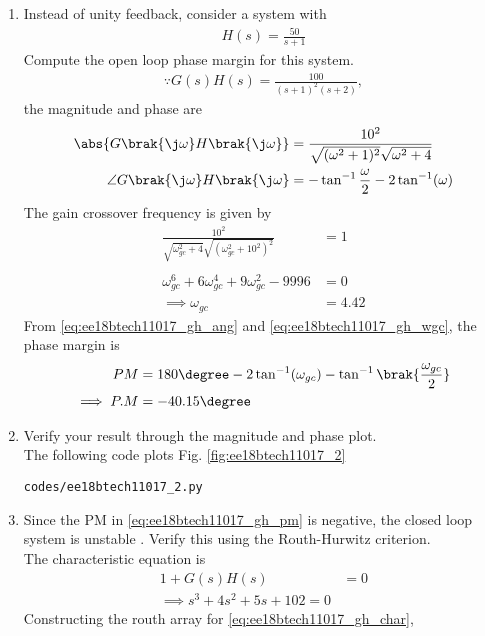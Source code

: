 \begin{enumerate}[label=\thesection.\arabic*.,ref=\thesection.\theenumi]
\item Instead of unity feedback, consider a system with 
%
\begin{align}
H(s)=\frac{50}{s+1}
\end{align}
%
Compute the open loop phase margin for this system.
\\
\solution 
%
\begin{align}
\because G(s)H(s)=\frac{100}{(s+1)^{2}(s+2)},
\label{eq:ee18btech11017_gh}
\end{align}
%
the  magnitude and phase are
\begin{align}
\label{eq:ee18btech11017_gh_mag}
\abs{G\brak{\j\omega}H\brak{\j\omega}}&=\frac{10^{2}}{ \sqrt{(\omega^{2}+1)^{2}}
\sqrt{\omega^{2}+4}} \\
\angle G\brak{\j\omega}H\brak{\j\omega}&=-\tan^{-1}\frac{\omega}{2}-2\tan^{-1}(\omega) 
\label{eq:ee18btech11017_gh_ang}
\end{align}
%
The gain crossover frequency is given by 
\begin{align}
\frac{10^{2}}{\sqrt{\omega_{gc}^{2}+4} \sqrt{(\omega_{gc}^{2}+10^{2})^{2}}}&=1 \\
\\
\omega_{gc}^{6}+6\omega_{gc}^{4}+9\omega_{gc}^{2}-9996&=0 
\\
\implies \omega_{gc} &= 4.42  
\label{eq:ee18btech11017_gh_wgc}
\end{align}
%
From \eqref{eq:ee18btech11017_gh_ang} and \eqref{eq:ee18btech11017_gh_wgc},
the phase margin is
\begin{align}
PM &=180\degree-2\tan^{-1}(\omega_{gc})-\tan^{-1}\brak{\frac{\omega_{gc}}{2}} \\
\implies  P.M &=-40.15\degree
\label{eq:ee18btech11017_gh_pm}
\end{align}
\item Verify your result through the magnitude and phase plot.
\\
\solution The following code plots Fig. \ref{fig:ee18btech11017_2}
\begin{lstlisting}
codes/ee18btech11017_2.py
\end{lstlisting}
%
\item Since the PM in \eqref{eq:ee18btech11017_gh_pm} is negative, the closed loop system is unstable .
Verify this using the Routh-Hurwitz criterion.
%
\\
\solution 
The characteristic equation is 
\begin{align}
1+G(s)H(s)&=0 
\\
\implies s^{3}+4s^{2}+5s+102=0   
\label{eq:ee18btech11017_gh_char}
\end{align}
Constructing the routh array for \eqref{eq:ee18btech11017_gh_char},


\end{enumerate}
